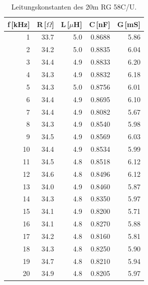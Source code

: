 \begin{table}
\centering
	\caption[]{Leitungskonstanten des 20m RG 58C/U.}
	\begin{tabular}{r r r r r}
		f\,[kHz] & R\,[$\Omega$] & L\,[$\mu$H] & C\,[nF] & G\,[mS]\\
		\hline \hline
			  1	 &	33.7	&	5.0	&	0.8688	&	5.86\\
			  2	 &	34.2	&	5.0	&	0.8835	&	6.04\\
			  3	 &	34.4	&	4.9	&	0.8833	&	6.20\\
			  4	 &	34.3	&	4.9	&	0.8832	&	6.18\\
			  5	 &	34.3	&	5.0	&	0.8756	&	6.01\\
			  6	 &	34.4	&	4.9	&	0.8695	&	6.10\\
			  7	 &	34.4	&	4.9	&	0.8082	&	5.67\\
			  8	 &	34.3	&	4.9	&	0.8540	&	5.98\\
			  9	 &	34.5	&	4.9	&	0.8569	&	6.03\\
			 10  &	34.4	&	4.9	&	0.8534	&	5.99\\
			 11	 &	34.5	&	4.8	&	0.8518	&	6.12\\
			 12	 &	34.6	&	4.8	&	0.8496	&	6.12\\
			 13	 &	34.0	&	4.9	&	0.8460	&	5.87\\
			 14	 &	34.3	&	4.8	&	0.8350	&	5.97\\
			 15	 &	34.1	&	4.9	&	0.8200	&	5.71\\
			 16	 &	34.1	&	4.8	&	0.8270	&	5.88\\
			 17	 &	34.2	&	4.8	&	0.8160	&	5.81\\
			 18	 &	34.3	&	4.8	&	0.8250	&	5.90\\
			 19	 &	34.7	&	4.8	&	0.8210	&	5.94\\
			 20	 &	34.9	&	4.8	&	0.8205	&	5.97\\
			\hline
	\end{tabular}
	\label{tab_konst2}
\end{table}

